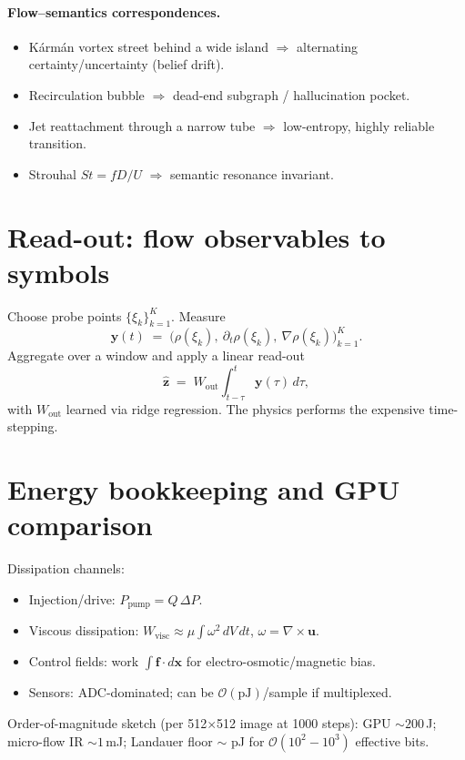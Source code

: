 \documentclass[11pt]{article}
\newcommand{\bv}[1]{\boldsymbol{#1}}
\begin{document}
\paragraph{Flow--semantics correspondences.}
\begin{itemize}[leftmargin=2em]
  \item Kármán vortex street behind a wide island $\Rightarrow$ alternating certainty/uncertainty (belief drift).
  \item Recirculation bubble $\Rightarrow$ dead-end subgraph / hallucination pocket.
  \item Jet reattachment through a narrow tube $\Rightarrow$ low-entropy, highly reliable transition.
  \item Strouhal $St=fD/U$ $\Rightarrow$ semantic resonance invariant.
\end{itemize}
\section{Read-out: flow observables to symbols}
Choose probe points $\{\xi_k\}_{k=1}^K$. Measure
\begin{equation}
\mathbf{y}(t) \;=\; \big(\rho(\xi_k),\ \partial_t\rho(\xi_k),\ \nabla\rho(\xi_k)\big)_{k=1}^K.
\end{equation}
Aggregate over a window and apply a linear read-out
\begin{equation}
\hat{\bv{z}} \;=\; W_{\text{out}}\int_{t-\tau}^{t}\mathbf{y}(\tau)\,d\tau,
\end{equation}
with $W_{\text{out}}$ learned via ridge regression. The physics performs the expensive time-stepping.
\section{Energy bookkeeping and GPU comparison}
Dissipation channels:
\begin{itemize}[leftmargin=2em]
  \item Injection/drive: $P_{\text{pump}} = Q\,\Delta P$.
  \item Viscous dissipation: $W_{\text{visc}} \approx \mu \int \omega^2\, dV\, dt$, $\omega=\nabla\times \bv{u}$.
  \item Control fields: work $\int \bv{f}\cdot d\bv{x}$ for electro-osmotic/magnetic bias.
  \item Sensors: ADC-dominated; can be $\mathcal{O}(\text{pJ})$/sample if multiplexed.
\end{itemize}
Order-of-magnitude sketch (per 512$\times$512 image at 1000 steps): GPU $\sim 200$\,J; micro-flow IR $\sim 1$\,mJ; Landauer floor $\sim$ pJ for $\mathcal{O}(10^2\!-\!10^3)$ effective bits.
\end{document}
